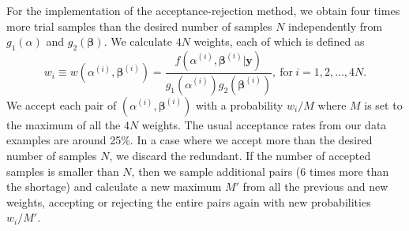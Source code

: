 \documentclass[article]{jss}
\begin{document}
For the  implementation of the acceptance-rejection method, we obtain four times more trial samples than the desired number of samples $N$ independently from $g_1(\alpha)$ and $g_2(\boldsymbol{\beta})$. We calculate $4N$ weights, each of which is defined as
\begin{equation}\label{weight}
w_i\equiv w(\alpha^{(i)}, \boldsymbol{\beta}^{(i)})=\frac{f(\alpha^{(i)}, \boldsymbol{\beta}^{(i)}\vert \boldsymbol{y})}{g_1(\alpha^{(i)})g_2( \boldsymbol{\beta}^{(i)})}, ~\textrm{for}~ i=1, 2, \ldots, 4N.
\end{equation}
We accept each pair of $(\alpha^{(i)}, \boldsymbol{\beta}^{(i)})$ with a probability $w_i/M$ where $M$ is set to the maximum of all the $4N$ weights. The usual acceptance rates from  our data examples are around 25\%. In a case where we accept more than the desired number of samples $N$, we discard the redundant. If the number of accepted samples is smaller than $N$, then we sample additional pairs (6 times more than the shortage) and calculate a new maximum $M'$ from all the previous and new weights, accepting or rejecting the entire pairs again with new probabilities $w_i/M'$.





\end{document}
